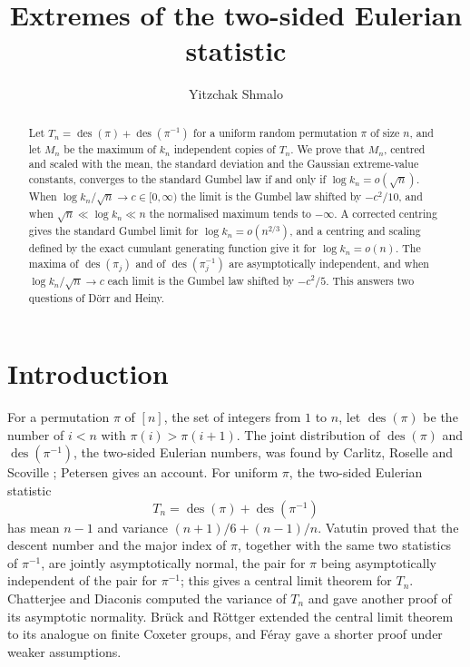 \documentclass[11pt]{amsart}
\title[Extremes of the two-sided Eulerian statistic]{Extremes of the two-sided Eulerian statistic}
\author{Yitzchak Shmalo}
\theoremstyle{remark}
\newcommand{\des}{\operatorname{des}}
\begin{document}
\begin{abstract}
Let $T_n=\des(\pi)+\des(\pi^{-1})$ for a uniform random permutation $\pi$ of size $n$, and let $M_n$ be the maximum of $k_n$ independent copies of $T_n$. We prove that $M_n$, centred and scaled with the mean, the standard deviation and the Gaussian extreme-value constants, converges to the standard Gumbel law if and only if $\log k_n=o(\sqrt n)$. When $\log k_n/\sqrt n\to c\in[0,\infty)$ the limit is the Gumbel law shifted by $-c^2/10$, and when $\sqrt n\ll\log k_n\ll n$ the normalised maximum tends to $-\infty$. A corrected centring gives the standard Gumbel limit for $\log k_n=o(n^{2/3})$, and a centring and scaling defined by the exact cumulant generating function give it for $\log k_n=o(n)$. The maxima of $\des(\pi_j)$ and of $\des(\pi_j^{-1})$ are asymptotically independent, and when $\log k_n/\sqrt n\to c$ each limit is the Gumbel law shifted by $-c^2/5$. This answers two questions of D\"orr and Heiny.
\end{abstract}


\maketitle

\section{Introduction}

For a permutation $\pi$ of $[n]$, the set of integers from $1$ to $n$, let $\des(\pi)$ be the number of $i<n$ with $\pi(i)>\pi(i+1)$. The joint distribution of $\des(\pi)$ and $\des(\pi^{-1})$, the two-sided Eulerian numbers, was found by Carlitz, Roselle and Scoville \cite{CRS66}; Petersen \cite{Pet13} gives an account. For uniform $\pi$, the two-sided Eulerian statistic
\[
T_n=\des(\pi)+\des(\pi^{-1})
\]
has mean $n-1$ and variance $(n+1)/6+(n-1)/n$. Vatutin \cite{Vat96} proved that the descent number and the major index of $\pi$, together with the same two statistics of $\pi^{-1}$, are jointly asymptotically normal, the pair for $\pi$ being asymptotically independent of the pair for $\pi^{-1}$; this gives a central limit theorem for $T_n$. Chatterjee and Diaconis \cite{CD17} computed the variance of $T_n$ and gave another proof of its asymptotic normality. Br\"uck and R\"ottger \cite{BR22} extended the central limit theorem to its analogue on finite Coxeter groups, and F\'eray \cite{Fer20} gave a shorter proof under weaker assumptions.
\end{document}

